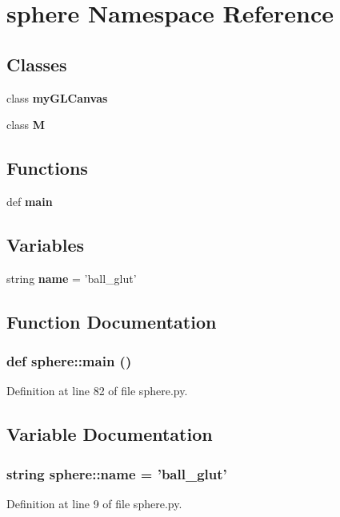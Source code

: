 \section{sphere Namespace Reference}
\label{namespacesphere}


\subsection*{Classes}
\begin{CompactItemize}
\item 
class {\bf myGLCanvas}
\item 
class {\bf M}
\end{CompactItemize}
\subsection*{Functions}
\begin{CompactItemize}
\item 
def {\bf main}
\end{CompactItemize}
\subsection*{Variables}
\begin{CompactItemize}
\item 
string {\bf name} = 'ball\_\-glut'
\end{CompactItemize}


\subsection{Function Documentation}
\subsubsection{\setlength{\rightskip}{0pt plus 5cm}def sphere::main ()}\label{namespacesphere_df77eb53d5a8ba509e040ca17e93a173}




Definition at line 82 of file sphere.py.

\subsection{Variable Documentation}
\subsubsection{\setlength{\rightskip}{0pt plus 5cm}string {\bf sphere::name} = 'ball\_\-glut'\hspace{0.3cm}{\tt  [static]}}\label{namespacesphere_9d18f0d3431bb47be86962d8f920579a}




Definition at line 9 of file sphere.py.